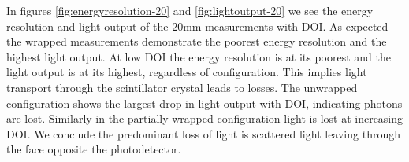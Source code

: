In figures \ref{fig:energyresolution-20} and \ref{fig:lightoutput-20} we see the energy resolution and light output of the 20mm measurements with DOI. As expected the wrapped measurements demonstrate the poorest energy resolution and the highest light output.  At low DOI the energy resolution is at its poorest and the light output is at its highest, regardless of configuration. This implies light transport through the scintillator crystal leads to losses. The unwrapped configuration shows the largest drop in light output with DOI, indicating photons are lost. Similarly in the partially wrapped configuration light is lost at increasing DOI. We conclude the predominant loss of light is scattered light leaving through the face opposite the photodetector.